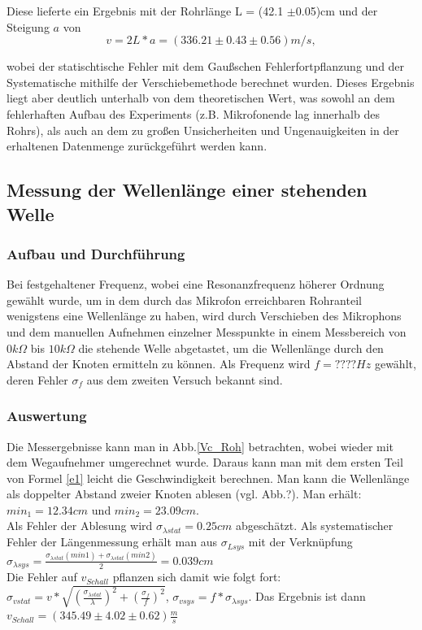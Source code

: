 \documentclass[]{article}
\begin{document}
	Diese lieferte ein Ergebnis mit der Rohrlänge L = (42.1 $\pm$0.05)cm und der Steigung $a$ von 
	\begin{equation}
		v = 2L*a = (336.21 \pm 0.43 \pm 0.56) m/s,
	\end{equation}
	
	wobei der statischtische Fehler mit dem Gaußschen Fehlerfortpflanzung und der Systematische mithilfe der Verschiebemethode berechnet wurden. Dieses Ergebnis liegt aber deutlich unterhalb von dem theoretischen Wert, was sowohl an dem fehlerhaften Aufbau des Experiments (z.B. Mikrofonende lag innerhalb des Rohrs), als auch an dem zu großen Unsicherheiten und Ungenauigkeiten in der erhaltenen Datenmenge zurückgeführt werden kann.
	
	\subsection{Messung der Wellenlänge einer stehenden Welle}
	\subsubsection{Aufbau und Durchführung}
	Bei festgehaltener Frequenz, wobei eine Resonanzfrequenz höherer Ordnung gewählt wurde, um in dem durch das Mikrofon erreichbaren Rohranteil wenigstens eine Wellenlänge zu haben, wird durch Verschieben des Mikrophons und dem manuellen Aufnehmen einzelner Messpunkte in einem Messbereich von $0k\Omega$ bis $10k\Omega$ die stehende Welle abgetastet, um die Wellenlänge durch den Abstand der Knoten ermitteln zu können. Als Frequenz wird $f=????Hz$ gewählt, deren Fehler $\sigma_f$ aus dem zweiten Versuch bekannt sind.
	\subsubsection{Auswertung}
	
	Die Messergebnisse kann man in Abb.\ref{Vc_Roh} betrachten, wobei wieder mit dem Wegaufnehmer umgerechnet wurde. Daraus kann man mit dem ersten Teil von Formel \ref{e1} leicht die Geschwindigkeit berechnen. Man kann die Wellenlänge als doppelter Abstand zweier Knoten ablesen (vgl. Abb.?). Man erhält: $min_1=12.34cm$ und $min_2=23.09cm$.\\ 
	 Als Fehler der Ablesung wird $\sigma_{\lambda stat}=0.25cm$ abgeschätzt. Als systematischer Fehler der Längenmessung erhält man aus $\sigma_{Lsys}$ mit der Verknüpfung $\sigma_{\lambda sys} = \frac{\sigma_{\lambda stat}(min1)+\sigma_{\lambda stat}(min2)}{2}=0.039cm$\\
	 Die Fehler auf $v_{Schall}$ pflanzen sich damit wie folgt fort: $\sigma_{vstat}=v*\sqrt{(\frac{\sigma_{\lambda stat}}{\lambda})^2+(\frac{\sigma_f}{f})^2}$, 
	 $\sigma_{vsys}=f*\sigma_{\lambda sys}$.
	 Das Ergebnis ist dann $v_{Schall}=(345.49 \pm 4.02 \pm 0.62)\frac{m}{s}$
\end{document}
